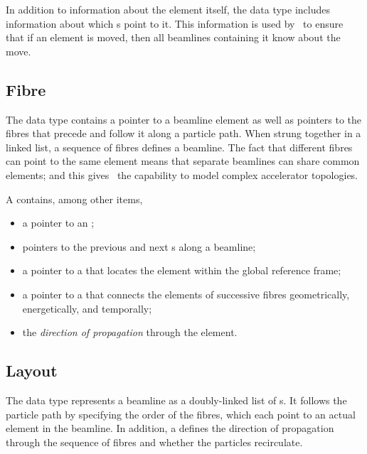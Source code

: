 In addition to information about the element itself, the data type
 includes information about which s
point to it. This information is used by \PTC\ to ensure that if
an element is moved, then all beamlines containing it know about
the move.



\subsection{Fibre}

%
The data type  contains a pointer to a beamline
element as well as pointers to the fibres that precede and follow
it along a particle path. When strung together in a linked list,
a sequence of fibres defines a beamline. The fact that different
fibres can point to the same element means that separate beamlines
can share common elements; and this gives \PTC\ the capability to
model complex accelerator topologies.

%
A  contains, among other items,
\begin{itemize}
  \item a pointer to an ;
  \item pointers to the previous and next s
        along a beamline;
  \item a pointer to a  that locates the element
        within the global reference frame;
  \item a pointer to a  that connects the elements
        of successive fibres geometrically, energetically, and
        temporally;
  \item the \emph{direction of propagation} through the element.
\end{itemize}


\subsection{Layout}

%
The data type  represents a beamline as a doubly-linked
list of s. It follows the particle path by specifying
the order of the fibres, which each point to an actual element in
the beamline.%
In addition, a  defines the direction of
propagation through the sequence of fibres and whether the particles
recirculate.


